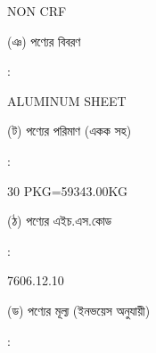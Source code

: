 \documentclass[12pt]{article}
\newcommand{\good}{ALUMINUM SHEET}
\newcommand{\pkg}{30 PKG=59343.00KG}
\newcommand{\crf}{NON CRF}
\newcommand{\crfdt}{}
\newcommand{\hscode}{7606.12.10}
\begin{document}
\begin{minipage}[t]{0.50\linewidth}
{\crf} \hspace{2em} {\crfdt}
\\
\end{minipage}
\begin{minipage}[t]{0.05\linewidth}
\hspace*{1em}
\end{minipage}
\begin{minipage}[t]{0.45\linewidth}
(ঞ) পণ্যের বিবরণ
\end{minipage}
\begin{minipage}[t]{0.02\linewidth}
:
\end{minipage}
\begin{minipage}[t]{0.50\linewidth}
{\good}
\\
\end{minipage}
\begin{minipage}[t]{0.05\linewidth}
\hspace*{1em}
\end{minipage}
\begin{minipage}[t]{0.45\linewidth}
(ট) পণ্যের পরিমাণ (একক সহ)
\end{minipage}
\begin{minipage}[t]{0.02\linewidth}
:
\end{minipage}
\begin{minipage}[t]{0.50\linewidth}
{\pkg}
\\
\end{minipage}
\begin{minipage}[t]{0.05\linewidth}
\hspace*{1em}
\end{minipage}
\begin{minipage}[t]{0.45\linewidth}
(ঠ) পণ্যের এইচ.এস.কোড
\end{minipage}
\begin{minipage}[t]{0.02\linewidth}
:
\end{minipage}
\begin{minipage}[t]{0.50\linewidth}
{\hscode}
\\
\end{minipage}
\begin{minipage}[t]{0.05\linewidth}
\hspace*{1em}
\end{minipage}
\begin{minipage}[t]{0.45\linewidth}
(ড) পণ্যের মূল্য (ইনভয়েস অনুযায়ী)
\end{minipage}
\begin{minipage}[t]{0.02\linewidth}
:
\end{minipage}
\end{document}

